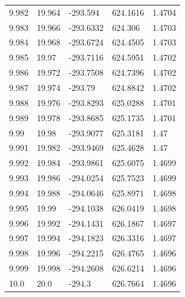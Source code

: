 \begin{tabular}{lllll}
9.982 & 19.964 & -293.594 & 624.1616 & 1.4704 \\
9.983 & 19.966 & -293.6332 & 624.306 & 1.4703 \\
9.984 & 19.968 & -293.6724 & 624.4505 & 1.4703 \\
9.985 & 19.97 & -293.7116 & 624.5951 & 1.4702 \\
9.986 & 19.972 & -293.7508 & 624.7396 & 1.4702 \\
9.987 & 19.974 & -293.79 & 624.8842 & 1.4702 \\
9.988 & 19.976 & -293.8293 & 625.0288 & 1.4701 \\
9.989 & 19.978 & -293.8685 & 625.1735 & 1.4701 \\
9.99 & 19.98 & -293.9077 & 625.3181 & 1.47 \\
9.991 & 19.982 & -293.9469 & 625.4628 & 1.47 \\
9.992 & 19.984 & -293.9861 & 625.6075 & 1.4699 \\
9.993 & 19.986 & -294.0254 & 625.7523 & 1.4699 \\
9.994 & 19.988 & -294.0646 & 625.8971 & 1.4698 \\
9.995 & 19.99 & -294.1038 & 626.0419 & 1.4698 \\
9.996 & 19.992 & -294.1431 & 626.1867 & 1.4697 \\
9.997 & 19.994 & -294.1823 & 626.3316 & 1.4697 \\
9.998 & 19.996 & -294.2215 & 626.4765 & 1.4696 \\
9.999 & 19.998 & -294.2608 & 626.6214 & 1.4696 \\
10.0 & 20.0 & -294.3 & 626.7664 & 1.4696 \\
\bottomrule
\end{tabular}
